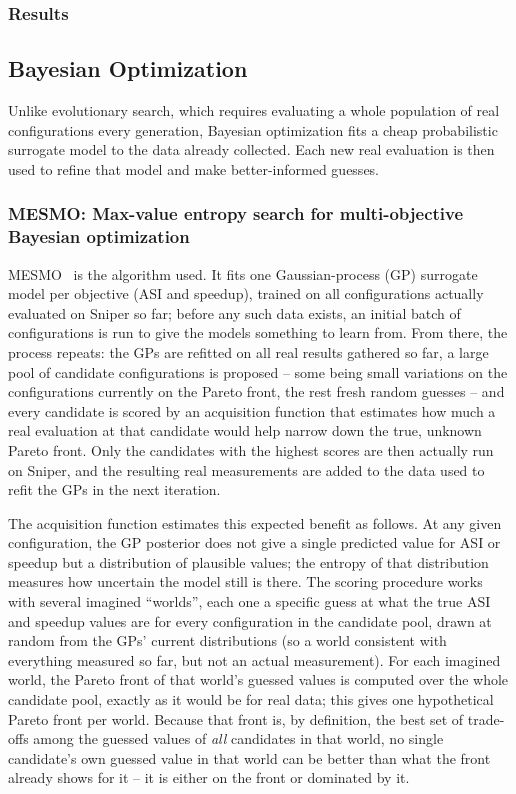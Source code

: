 \documentclass[12pt,a4paper,faculty=ea,language=en]{ugent-doc}
\begin{document}
\subsubsection{Results}
\subsection{Bayesian Optimization}
Unlike evolutionary search, which requires evaluating a whole population of real configurations every generation, Bayesian optimization fits a cheap probabilistic surrogate model to the data already collected. Each new real evaluation is then used to refine that model and make better-informed guesses.
\subsubsection{MESMO: Max-value entropy search for multi-objective Bayesian optimization}
\label{mesmo}
MESMO~\cite{mesmo2019} is the algorithm used. It fits one Gaussian-process (GP) surrogate model per objective (ASI and speedup), trained on all configurations actually evaluated on Sniper so far; before any such data exists, an initial batch of configurations is run to give the models something to learn from. From there, the process repeats: the GPs are refitted on all real results gathered so far, a large pool of candidate configurations is proposed -- some being small variations on the configurations currently on the Pareto front, the rest fresh random guesses -- and every candidate is scored by an acquisition function that estimates how much a real evaluation at that candidate would help narrow down the true, unknown Pareto front. Only the candidates with the highest scores are then actually run on Sniper, and the resulting real measurements are added to the data used to refit the GPs in the next iteration.

The acquisition function estimates this expected benefit as follows. At any given configuration, the GP posterior does not give a single predicted value for ASI or speedup but a distribution of plausible values; the entropy of that distribution measures how uncertain the model still is there. The scoring procedure works with several imagined ``worlds'', each one a specific guess at what the true ASI and speedup values are for every configuration in the candidate pool, drawn at random from the GPs' current distributions (so a world consistent with everything measured so far, but not an actual measurement). For each imagined world, the Pareto front of that world's guessed values is computed over the whole candidate pool, exactly as it would be for real data; this gives one hypothetical Pareto front per world. Because that front is, by definition, the best set of trade-offs among the guessed values of \emph{all} candidates in that world, no single candidate's own guessed value in that world can be better than what the front already shows for it -- it is either on the front or dominated by it.
\end{document}
